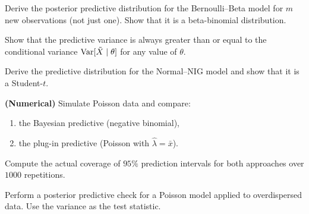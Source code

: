 \begin{exercise}
Derive the posterior predictive distribution for the Bernoulli--Beta
model for $m$ new observations (not just one). Show that it is a
beta-binomial distribution.
\end{exercise}

\begin{exercise}
Show that the predictive variance is always greater than or equal to
the conditional variance $\mathrm{Var}[\tilde{X} \mid \theta]$ for any value of
$\theta$.
\end{exercise}

\begin{exercise}
Derive the predictive distribution for the Normal--NIG model and show
that it is a Student-$t$.
\end{exercise}

\begin{exercise}
\textbf{(Numerical)} Simulate Poisson data and compare:
\begin{enumerate}
  \item the Bayesian predictive (negative binomial),
  \item the plug-in predictive (Poisson with $\hat{\lambda} = \bar{x}$).
\end{enumerate}
Compute the actual coverage of $95\%$ prediction intervals for both
approaches over $1000$ repetitions.
\end{exercise}

\begin{exercise}
Perform a posterior predictive check for a Poisson model applied to
overdispersed data. Use the variance as the test statistic.
\end{exercise}
